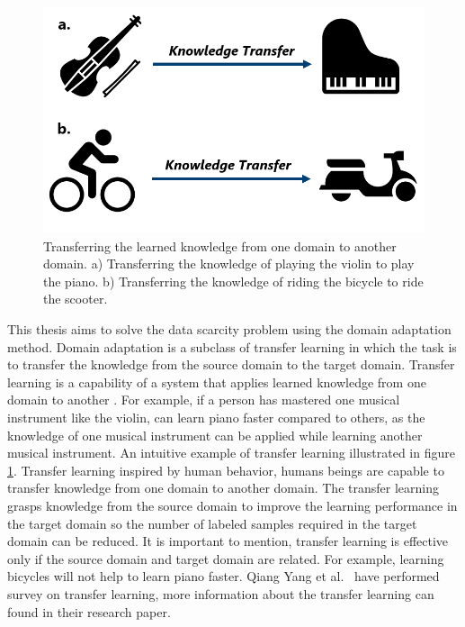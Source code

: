 \begin{figure}[H]
        \begin{center}
 	    \includegraphics[scale=0.40]{images/Introduction/TransferLearning.png}
	    \caption[Transferring the learned knowledge from one domain to another domain.]{Transferring the learned knowledge from one domain to another domain. a) Transferring the knowledge of playing the violin to play the piano. b) Transferring the knowledge of riding the bicycle to ride the scooter.}
	    \label{fig:TransferLearning}
	    \end{center}
\end{figure}

This thesis aims to solve the data scarcity problem using the domain adaptation method. Domain adaptation is a subclass of transfer learning in which the task is to transfer the knowledge from the source domain to the target domain. Transfer learning is a capability of a system that applies learned knowledge from one domain to another \cite{zhuang2020comprehensive}. For example, if a person has mastered one musical instrument like the violin, can learn piano faster compared to others, as the knowledge of one musical instrument can be applied while learning another musical instrument. An intuitive example of transfer learning illustrated in figure \ref{fig:TransferLearning}. Transfer learning inspired by human behavior, humans beings are capable to transfer knowledge from one domain to another domain. The transfer learning grasps knowledge from the source domain to improve the learning performance in the target domain so the number of labeled samples required in the target domain can be reduced. It is important to mention, transfer learning is effective only if the source domain and target domain are related. For example, learning bicycles will not help to learn piano faster. Qiang Yang et al.\ \cite{5288526} have performed survey on transfer learning, more information about the transfer learning can found in their research paper.  




